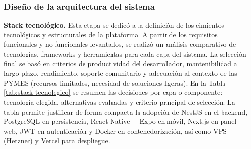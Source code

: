   \subsubsection{Diseño de la arquitectura del sistema}
  \textbf{Stack tecnológico.} Esta etapa se dedicó a la definición de los cimientos tecnológicos y estructurales de la plataforma. A partir de los requisitos funcionales y no funcionales levantados, se realizó un análisis comparativo de tecnologías, frameworks y herramientas para cada capa del sistema. La selección final se basó en criterios de productividad del desarrollador, mantenibilidad a largo plazo, rendimiento, soporte comunitario y adecuación al contexto de las PYMES (recursos limitados, necesidad de soluciones ligeras). En la Tabla \ref{tab:stack-tecnologico} se resumen las decisiones por capa o componente: tecnología elegida, alternativas evaluadas y criterio principal de selección. La tabla permite justificar de forma compacta la adopción de NestJS en el backend, PostgreSQL en persistencia, React Native + Expo en móvil, Next.js en panel web, JWT en autenticación y Docker en contenedorización, así como VPS (Hetzner) y Vercel para despliegue.

